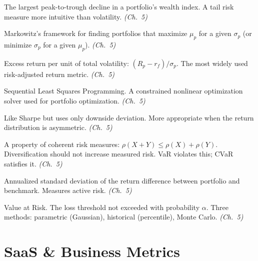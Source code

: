 \begin{description}[style=nextline, leftmargin=2em]
\item[\textbf{Maximum Drawdown (MDD)}] The largest peak-to-trough decline in a portfolio's wealth index. A tail risk measure more intuitive than volatility. \textit{(Ch.~5)}

\item[\textbf{Mean-Variance Optimization}] Markowitz's framework for finding portfolios that maximize $\mu_p$ for a given $\sigma_p$ (or minimize $\sigma_p$ for a given $\mu_p$). \textit{(Ch.~5)}

\item[\textbf{Sharpe Ratio}] Excess return per unit of total volatility: $(R_p - r_f)/\sigma_p$. The most widely used risk-adjusted return metric. \textit{(Ch.~5)}

\item[\textbf{SLSQP}] Sequential Least Squares Programming. A constrained nonlinear optimization solver used for portfolio optimization. \textit{(Ch.~5)}

\item[\textbf{Sortino Ratio}] Like Sharpe but uses only downside deviation. More appropriate when the return distribution is asymmetric. \textit{(Ch.~5)}

\item[\textbf{Subadditivity}] A property of coherent risk measures: $\rho(X+Y) \leq \rho(X) + \rho(Y)$. Diversification should not increase measured risk. VaR violates this; CVaR satisfies it. \textit{(Ch.~5)}

\item[\textbf{Tracking Error}] Annualized standard deviation of the return difference between portfolio and benchmark. Measures active risk. \textit{(Ch.~5)}

\item[\textbf{VaR}] Value at Risk. The loss threshold not exceeded with probability $\alpha$. Three methods: parametric (Gaussian), historical (percentile), Monte Carlo. \textit{(Ch.~5)}

\end{description}

\section*{SaaS \& Business Metrics}

